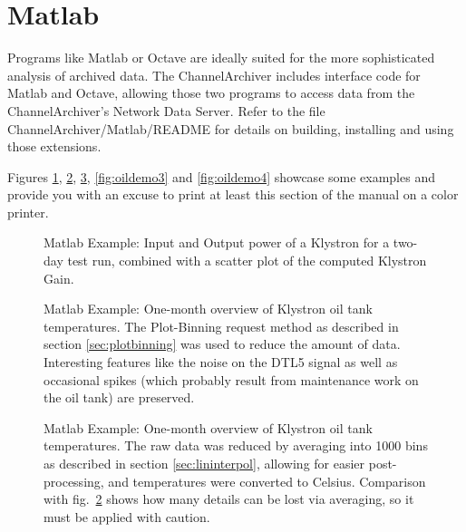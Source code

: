 \section{Matlab}
Programs like Matlab or Octave are ideally suited for the more
sophisticated analysis of archived data.  The ChannelArchiver
includes interface code for Matlab and Octave, allowing those two
programs to access data from the ChannelArchiver's Network Data
Server.  Refer to the file ChannelArchiver/Matlab/README for details
on building, installing and using those extensions.

Figures \ref{fig:matlabtest}, \ref{fig:oildemo1},
\ref{fig:oildemo2}, \ref{fig:oildemo3} and
\ref{fig:oildemo4} showcase some examples and provide you with an
excuse to print at least this section of the manual on a color printer.

\begin{figure}[htb]
\begin{center}
\end{center}
\caption{\label{fig:matlabtest}Matlab Example: Input and Output power
  of a Klystron for a two-day test run, combined with a scatter plot
  of the computed Klystron Gain.}
\end{figure}

\begin{figure}[htb]
\begin{center}
\end{center}
\caption{\label{fig:oildemo1}Matlab Example: One-month overview of
  Klystron oil tank temperatures. The Plot-Binning request method as
  described in section \ref{sec:plotbinning} was used to reduce the
  amount of data. Interesting features like the noise on the DTL5
  signal as well as occasional spikes (which probably result from
  maintenance work on the oil tank) are preserved.
}
\end{figure}

\begin{figure}[htb]
\begin{center}
\end{center}
\caption{\label{fig:oildemo2}Matlab Example: One-month overview of
  Klystron oil tank temperatures. The raw data was reduced by
  averaging into 1000 bins as described in section
  \ref{sec:lininterpol}, allowing for easier post-processing,
  and temperatures were converted to Celsius.
  Comparison with fig.\ \ref{fig:oildemo1} shows how many details can
  be lost via averaging, so it must be applied with caution.
}
\end{figure}

